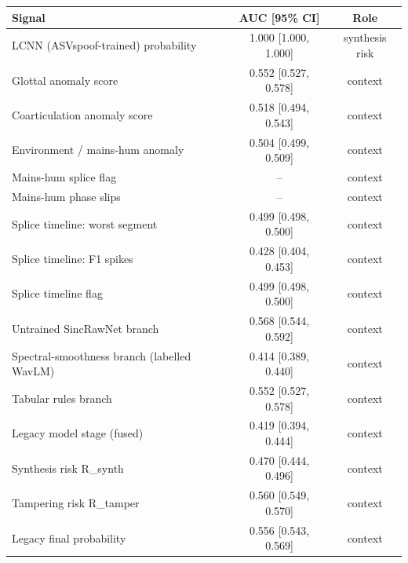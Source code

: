 \begin{tabular}{lcc}
\toprule
Signal & AUC [95\% CI] & Role \\
\midrule
LCNN (ASVspoof-trained) probability & 1.000 [1.000, 1.000] & synthesis risk \\
Glottal anomaly score & 0.552 [0.527, 0.578] & context \\
Coarticulation anomaly score & 0.518 [0.494, 0.543] & context \\
Environment / mains-hum anomaly & 0.504 [0.499, 0.509] & context \\
Mains-hum splice flag & -- & context \\
Mains-hum phase slips & -- & context \\
Splice timeline: worst segment & 0.499 [0.498, 0.500] & context \\
Splice timeline: F1 spikes & 0.428 [0.404, 0.453] & context \\
Splice timeline flag & 0.499 [0.498, 0.500] & context \\
Untrained SincRawNet branch & 0.568 [0.544, 0.592] & context \\
Spectral-smoothness branch (labelled WavLM) & 0.414 [0.389, 0.440] & context \\
Tabular rules branch & 0.552 [0.527, 0.578] & context \\
Legacy model stage (fused) & 0.419 [0.394, 0.444] & context \\
Synthesis risk R_synth & 0.470 [0.444, 0.496] & context \\
Tampering risk R_tamper & 0.560 [0.549, 0.570] & context \\
Legacy final probability & 0.556 [0.543, 0.569] & context \\
\bottomrule
\end{tabular}
